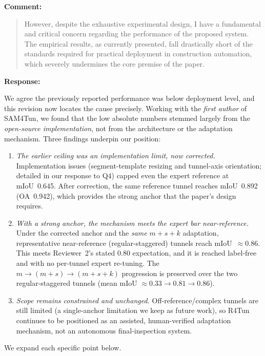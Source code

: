 \documentclass[11pt,a4paper]{article}
\newenvironment{commentblock}{%
  \par\smallskip\noindent\textbf{Comment:}\par
  \begin{quote}\itshape\color{black}
}{%
  \end{quote}\smallskip
}
\newenvironment{responseblock}{%
  \par\smallskip\noindent\textbf{Response:}\par
  \begingroup\color{responsegreen}
}{%
  \endgroup\smallskip
}
\begin{document}
\begin{commentblock}
However, despite the exhaustive experimental design, I have a fundamental and critical concern regarding the performance of the proposed system. The empirical results, as currently presented, fall drastically short of the standards required for practical deployment in construction automation, which severely undermines the core premise of the paper.
\end{commentblock}
\begin{responseblock}
We agree the previously reported performance was below deployment level, and this revision now locates the cause precisely. Working with the \emph{first author} of SAM4Tun, we found that the low absolute numbers stemmed largely from the \emph{open-source implementation}, not from the architecture or the adaptation mechanism. Three findings underpin our position:
\begin{enumerate}
\item \emph{The earlier ceiling was an implementation limit, now corrected.} Implementation issues (segment-template resizing and tunnel-axis orientation; detailed in our response to Q4) capped even the expert reference at mIoU~0.645. After correction, the same reference tunnel reaches mIoU~0.892 (OA~0.942), which provides the strong anchor that the paper's design requires.
\item \emph{With a strong anchor, the mechanism meets the expert bar near-reference.} Under the corrected anchor and the \emph{same} $m+s+k$ adaptation, representative near-reference (regular-staggered) tunnels reach mIoU~$\approx$0.86. This meets Reviewer~2's stated 0.80 expectation, and it is reached label-free and with no per-tunnel expert re-tuning. The $m\rightarrow(m+s)\rightarrow(m+s+k)$ progression is preserved over the two regular-staggered tunnels (mean mIoU $\approx 0.33\rightarrow0.81\rightarrow0.86$).
\item \emph{Scope remains constrained and unchanged.} Off-reference/complex tunnels are still limited (a single-anchor limitation we keep as future work), so R4Tun continues to be positioned as an assisted, human-verified adaptation mechanism, not an autonomous final-inspection system.
\end{enumerate}
We expand each specific point below.
\end{responseblock}
\end{document}
